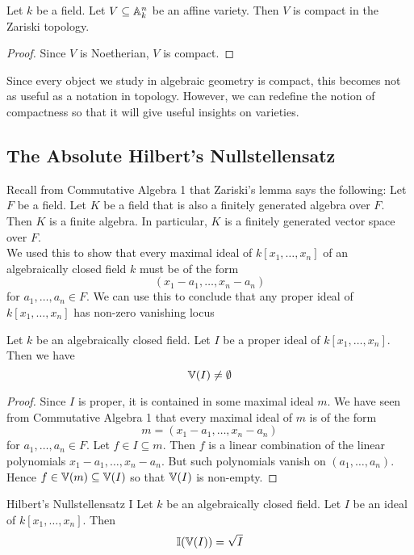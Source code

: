 \documentclass[a4paper]{article}
\begin{document}
\begin{crl}{}{} Let $k$ be a field. Let $V\subseteq\mathbb{A}_k^n$ be an affine variety. Then $V$ is compact in the Zariski topology. \tcbline
\begin{proof}
Since $V$ is Noetherian, $V$ is compact. 
\end{proof}
\end{crl}

Since every object we study in algebraic geometry is compact, this becomes not as useful as a notation in topology. However, we can redefine the notion of compactness so that it will give useful insights on varieties. 

\subsection{The Absolute Hilbert's Nullstellensatz}
Recall from Commutative Algebra 1 that Zariski's lemma says the following: Let $F$ be a field. Let $K$ be a field that is also a finitely generated algebra over $F$. Then $K$ is a finite algebra. In particular, $K$ is a finitely generated vector space over $F$. \\

We used this to show that every maximal ideal of $k[x_1,\dots,x_n]$ of an algebraically closed field $k$ must be of the form $$(x_1-a_1,\dots,x_n-a_n)$$ for $a_1,\dots,a_n\in F$. We can use this to conclude that any proper ideal of $k[x_1,\dots,x_n]$ has non-zero vanishing locus

\begin{lmm}{}{} Let $k$ be an algebraically closed field. Let $I$ be a proper ideal of $k[x_1,\dots,x_n]$. Then we have $$\mathbb{V}(I)\neq\emptyset$$ \tcbline
\begin{proof}
Since $I$ is proper, it is contained in some maximal ideal $m$. We have seen from Commutative Algebra 1 that every maximal ideal of $m$ is of the form $$m=(x_1-a_1,\dots,x_n-a_n)$$ for $a_1,\dots,a_n\in F$. Let $f\in I\subseteq m$. Then $f$ is a linear combination of the linear polynomials $x_1-a_1,\dots,x_n-a_n$. But such polynomials vanish on $(a_1,\dots,a_n)$. Hence $f\in\mathbb{V}(m)\subseteq\mathbb{V}(I)$ so that $\mathbb{V}(I)$ is non-empty. 
\end{proof}
\end{lmm}

\begin{thm}{Hilbert's Nullstellensatz I}{} Let $k$ be an algebraically closed field. Let $I$ be an ideal of $k[x_1,\dots,x_n]$. Then $$\mathbb{I}(\mathbb{V}(I))=\sqrt{I}$$
\end{thm}
\end{document}
